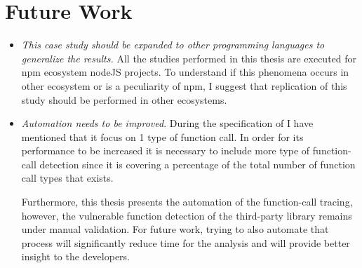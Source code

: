 \section{Future Work}
\begin{itemize}
    \item \textit{This case study should be expanded to other programming languages to generalize the results.} All the studies performed in this thesis are executed for npm ecosystem nodeJS projects. To understand if this phenomena occurs in other ecosystem or is a peculiarity of npm, I suggest that replication of this study should be performed in other ecosystems.
   
    \item \textit{Automation needs to be improved}. During the specification of \tool[] I have mentioned that it focus on 1 type of function call. In order for its performance to be increased it is necessary to include more type of function-call detection since it is covering a percentage of the total number of function call types that exists.
    
    Furthermore, this thesis presents the automation of the function-call tracing, however, the vulnerable function detection of the third-party library remains under manual validation. For future work, trying to also automate that process will significantly reduce time for the analysis and will provide better insight to the developers.
\end{itemize}

